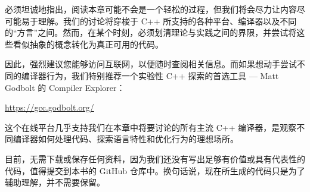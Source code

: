 必须坦诚地指出，阅读本章可能不会是一个轻松的过程，但我们将会尽力让内容尽可能易于理解。我们的讨论将穿梭于 C++ 所支持的各种平台、编译器以及不同的“方言”之间。然而，在某个时刻，必须划清理论与实践之间的界限，并尝试将这些看似抽象的概念转化为真正可用的代码。

因此，强烈建议您能够访问互联网，以便随时查阅相关信息。而如果想动手尝试不同的编译器行为，我们特别推荐一个实验性 C++ 探索的首选工具 --- Matt Godbolt 的 Compiler Explorer：

\url{https://gcc.godbolt.org/}

这个在线平台几乎支持我们在本章中将要讨论的所有主流 C++ 编译器，是观察不同编译器如何处理代码、探索语言特性和优化行为的理想场所。

目前，无需下载或保存任何资料，因为我们还没有写出足够有价值或具有代表性的代码，值得提交到本书的 GitHub 仓库中。换句话说，现在所生成的代码只是为了辅助理解，并不需要保留。